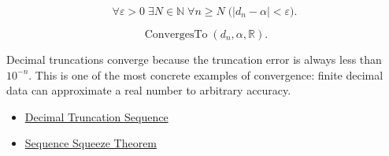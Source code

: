 \begin{remark*}
\[
\forall \varepsilon>0\;\exists N\in\mathbb{N}\;\forall n\ge N
\;\bigl(|d_n-\alpha|<\varepsilon\bigr).
\]
\end{remark*}

\begin{remark*}
\[
\operatorname{ConvergesTo}(d_n,\alpha,\mathbb{R}).
\]
\end{remark*}

\begin{remark*}[Interpretation]
Decimal truncations converge because the truncation error is always less
than $10^{-n}$. This is one of the most concrete examples of convergence:
finite decimal data can approximate a real number to arbitrary accuracy.
\end{remark*}

\begin{dependencies}
\begin{itemize}
  \item \hyperref[def:decimal-truncation-sequence]{Decimal Truncation Sequence}
  \item \hyperref[thm:sequence-squeeze-theorem]{Sequence Squeeze Theorem}
\end{itemize}
\end{dependencies}
